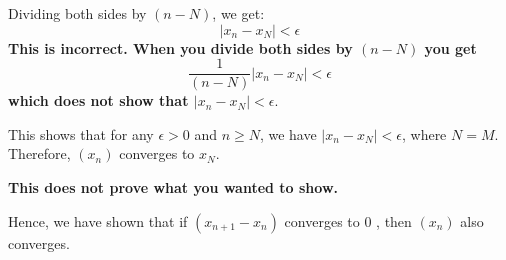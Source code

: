 \documentclass{report}
\begin{document}
Dividing both sides by $(n-N)$, we get:
$$
\left|x_n-x_N\right|<\epsilon
$$
\textbf{This is incorrect. When you divide both sides by $(n-N)$
you get
$$
\frac{1}{(n-N)}\left|x_n-x_N\right|<\epsilon
$$
which does not show that $\left|x_n-x_N\right|<\epsilon. $
}

This shows that for any $\epsilon>0$ and $n \geq N$, we have $\left|x_n-x_N\right|<\epsilon$, where $N=M$. Therefore, $\left(x_n\right)$ converges to $x_N$.

\textbf{This does not prove what you wanted to show. }

Hence, we have shown that if $\left(x_{n+1}-x_n\right)$ converges to 0 , then $\left(x_n\right)$ also converges.
\end{document}

